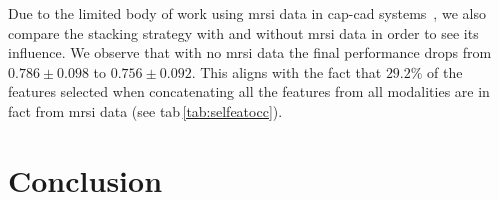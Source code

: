 \documentclass[num-refs]{wiley-article}
\begin{document}
Due to the limited body of work using \ac{mrsi} data in \ac{cap}-\ac{cad}
systems~\cite{lemaitre2015computer}, we also compare the stacking strategy with
and without \ac{mrsi} data in order to see its influence. We observe that with
no \ac{mrsi} data the final performance drops from 
$0.786 \pm 0.098$ to $0.756 \pm 0.092$.
This aligns with the fact that $29.2\%$ of the features selected when
concatenating all the features from all modalities are in fact from \ac{mrsi}
data (see \Ac{tab}\,\ref{tab:selfeatocc}).


\section{Conclusion}
\label{sec:conclusion}


\end{document}
